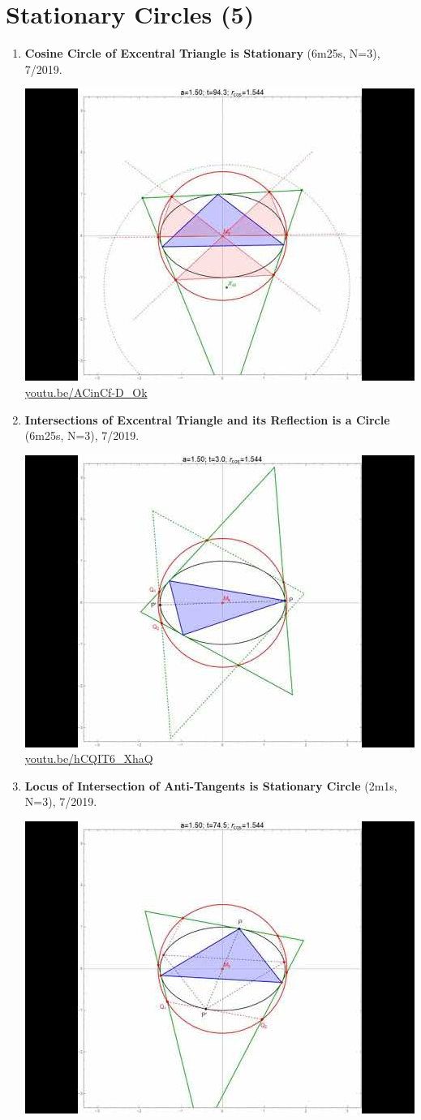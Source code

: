 \documentclass[12pt]{amsart}
\begin{document}
\section{Stationary Circles (5)}

\begin{enumerate}[resume]
\item \textbf{Cosine Circle of Excentral Triangle is Stationary} (6m25s, N=3), 7/2019. 
\begin{center}\includegraphics[width=.5\textwidth]{pics/ACinCf-D_Ok.jpg} \\ 
\href{https://youtu.be/ACinCf-D_Ok}{\url{youtu.be/ACinCf-D\_Ok}}\end{center}
% 
\item \textbf{Intersections of Excentral Triangle and its Reflection is a Circle} (6m25s, N=3), 7/2019. 
\begin{center}\includegraphics[width=.5\textwidth]{pics/hCQIT6_XhaQ.jpg} \\ 
\href{https://youtu.be/hCQIT6_XhaQ}{\url{youtu.be/hCQIT6\_XhaQ}}\end{center}
% 
\item \textbf{Locus of Intersection of Anti-Tangents is Stationary Circle} (2m1s, N=3), 7/2019. 
\begin{center}\includegraphics[width=.5\textwidth]{pics/CrOSI8d8qDc.jpg} \\ 

\end{center}
\end{enumerate}
\end{document}
